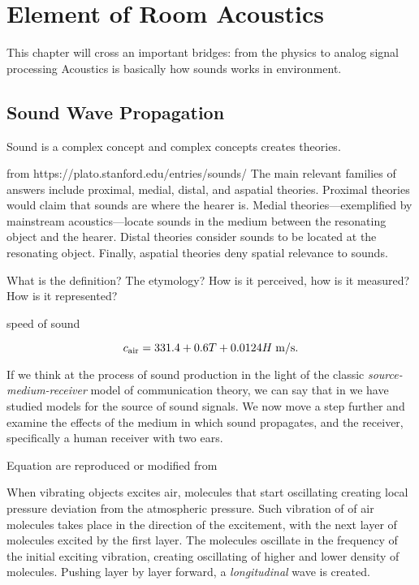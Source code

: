 \chapter{Element of Room Acoustics}\label{chap:acoustics}

 This chapter will cross an important bridges: from the physics to analog signal processing
Acoustics is basically how sounds works in environment.


\section{Sound Wave Propagation}\label{ch:acoustics:sec:wave}

Sound is a complex concept and complex concepts creates theories.


from https://plato.stanford.edu/entries/sounds/
The main relevant families of answers include proximal, medial, distal, and aspatial theories.
Proximal theories would claim that sounds are where the hearer is.
Medial theories—exemplified by mainstream acoustics—locate sounds in the medium between the resonating object and the hearer.
Distal theories consider sounds to be located at the resonating object. Finally, aspatial theories deny spatial relevance to sounds.

What is the definition? The etymology?
How is it perceived, how is it measured? How is it represented?

speed of sound

\begin{equation}
    c_\text{air} =  331.4 + 0.6T + 0.0124H \; \text{m/s}
    .
\end{equation}


If we think at the process of sound production in the light of the classic \textit{source-medium-receiver} model of communication theory,
we can say that in we have studied models for the source of sound signals. We now move a step further and examine the effects of the medium in which sound propagates, and the receiver, specifically a human receiver with two ears.

Equation are reproduced or modified from \cite{Kuttruff2009room, Marczuk2006modelling, Habets2010generator, Avanzini2019Chapter4, Allen1999image}

When vibrating objects excites air, molecules that start oscillating creating local pressure deviation from the atmospheric pressure.
Such vibration of of air molecules takes place in the direction of the excitement, with the next layer of molecules excited by the first layer.
The molecules oscillate in the frequency of the initial exciting vibration, creating oscillating of higher and lower density of molecules.
Pushing layer by layer forward, a \textit{longitudinal} wave is created.

